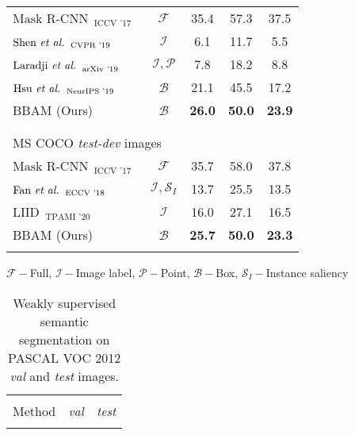\documentclass[final]{cvpr}
\begin{document}
\begin{table}[t]
\begin{threeparttable}
\begin{tabular}{l @{\hskip 0.08in} c@{\hskip 0.12in}c @{\hskip 0.12in} c @{\hskip 0.1in}c}
    
    $\text{Mask R-CNN}_{\text{~~ICCV '17}}$~\cite{he2017mask} & $\mathcal{F}$ & 35.4  & 57.3  & 37.5\\
    $\text{Shen \textit{et al.}}_{\text{~~CVPR '19}}$~\cite{shen2019cyclic}  & $\mathcal{I}$ & 6.1   & 11.7  & 5.5 \\
    $\text{Laradji \textit{et al.}}_{\text{~~arXiv '19}}$~\cite{laradji2019instance} & $\mathcal{I}, \mathcal{P}$ &      7.8 &     18.2  &   8.8 \\
    $\text{Hsu \textit{et al.}}_{\text{~~NeurIPS '19}}$~\cite{hsu2019weakly} & $\mathcal{B}$& 21.1  & 45.5    & 17.2 \\
    BBAM (Ours)  & $\mathcal{B}$ &     \textbf{26.0}  &  \textbf{50.0}     &   \textbf{23.9} \\
    \\[-0.9em]
    \hline
    \\[-0.9em]
    \multicolumn{4}{l}{MS COCO \textit{test-dev} images}\\
    $\text{Mask R-CNN}_{\text{~~ICCV '17}}$~\cite{he2017mask} & $\mathcal{F}$  &  35.7     &   58.0    & 37.8 \\
    $\text{Fan \textit{et al.}}_{\text{~~ECCV '18}}$~\cite{fan2018associating}  & $\mathcal{I}, \mathcal{S}_I$  & 13.7  & 25.5  & 13.5 \\
    $\text{LIID}_{\text{~~TPAMI '20}}$~\cite{liu2020leveraging}  & $\mathcal{I}$   & 16.0  & 27.1    & 16.5 \\
   BBAM (Ours)  & $\mathcal{B}$ &     \textbf{25.7}  &  \textbf{50.0}     &   \textbf{23.3} \\
\Xhline{1pt}
\end{tabular}\begin{tablenotes}
  \footnotesize
\item $\mathcal{F}-$Full, $\mathcal{I}-$Image label, $\mathcal{P}-$Point, $\mathcal{B}-$Box, $\mathcal{S}_I-$Instance saliency
        \end{tablenotes}
     \end{threeparttable}
    \vspace{-0.7em}
      \end{table} \begin{table}[t]
\renewcommand{\arraystretch}{0.97}
\centering
  \caption{Weakly supervised semantic segmentation on PASCAL VOC 2012 \textit{val} and \textit{test} images.}  \label{table_semantic}
\vspace{-0.8em}
\begin{tabular}{l@{\hskip 1.in}c@{\hskip 0.2in}c}
    \Xhline{1pt}\\[-0.95em]
    Method  & \textit{val} & \textit{test}\\
    \hline\hline 
    \\[-0.9em]
    

\end{tabular}
\end{table}
\end{document}
